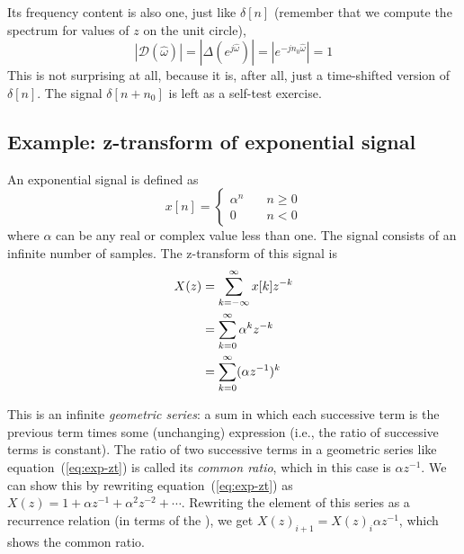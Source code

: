 Its frequency content is also one, just like $\delta[n]$ (remember
that we compute the spectrum for values of $z$ on the unit circle),
\begin{equation}
|\mathcal{D}(\hat{\omega})|=|\Delta(e^{j\hat{\omega}})|=|e^{-jn_0\hat{\omega}}|=1
\end{equation}
This is not surprising at all, because it is, after all, just a
time-shifted version of $\delta[n]$. The signal $\delta[n+n_0]$ is
left as a self-test exercise.


\subsection{Example: z-transform of exponential signal}
\label{sc:zx-exp}

An exponential signal is defined as 
\begin{equation}
x[n] = \left\{\begin{array}{ll}
                        \alpha^n & \quad  n \ge 0 \\
                        0        & \quad n < 0
          \end{array}\right.
\label{eq:zt-expof}
\end{equation}
where $\alpha$ can be any real or complex value less than one. The
signal consists of an infinite number of samples. The z-transform of
this signal is
\begin{align}
X(z) &= \sum_{k=-\infty}^{\infty} x[k] z^{-k} \notag\\
     &= \sum_{k=0}^{\infty}\alpha^k  z^{-k} \notag\\
     &= \sum_{k=0}^{\infty}(\alpha z^{-1})^k
\label{eq:exp-zt}
\end{align}

This is an infinite \emph{geometric series}: a sum in which each
successive term is the previous term times some (unchanging)
expression (i.e., the ratio of successive terms is constant).
 The ratio of two successive terms in a
geometric series like 
equation~(\ref{eq:exp-zt}) is called its \emph{common ratio}, which in
this case is $\alpha z^{-1}$. We can show this by rewriting
equation~(\ref{eq:exp-zt}) as $X(z) = 1 + \alpha z^{-1} + \alpha^{2}
z^{-2} + \cdots$. Rewriting the  element of this
series as a recurrence relation (in terms of the ),
we get $X(z)_{i+1} = X(z)_i \alpha z^{-1}$, which shows the common ratio.
  

